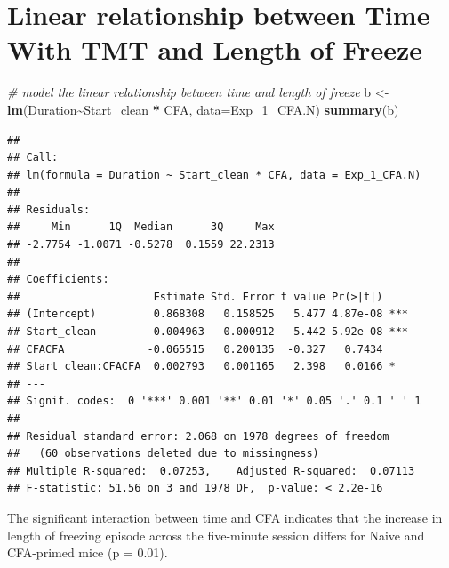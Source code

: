\documentclass[
]{book}
\newenvironment{Shaded}{\begin{snugshade}}{\end{snugshade}}
\newcommand{\AttributeTok}[1]{\textcolor[rgb]{0.13,0.29,0.53}{#1}}
\newcommand{\CommentTok}[1]{\textcolor[rgb]{0.56,0.35,0.01}{\textit{#1}}}
\newcommand{\FunctionTok}[1]{\textcolor[rgb]{0.13,0.29,0.53}{\textbf{#1}}}
\newcommand{\NormalTok}[1]{#1}
\newcommand{\OtherTok}[1]{\textcolor[rgb]{0.56,0.35,0.01}{#1}}
\newcommand{\SpecialCharTok}[1]{\textcolor[rgb]{0.81,0.36,0.00}{\textbf{#1}}}
\newcommand{\StringTok}[1]{\textcolor[rgb]{0.31,0.60,0.02}{#1}}
\begin{document}
\section*{Linear relationship between Time With TMT and Length of Freeze}\label{linear-relationship-between-time-with-tmt-and-length-of-freeze}

\begin{Shaded}
\begin{Highlighting}[]
\CommentTok{\# model the linear relationship between time and length of freeze}
\NormalTok{b }\OtherTok{\textless{}{-}} \FunctionTok{lm}\NormalTok{(Duration}\SpecialCharTok{\textasciitilde{}}\NormalTok{Start\_clean }\SpecialCharTok{*}\NormalTok{ CFA, }\AttributeTok{data=}\NormalTok{Exp\_1\_CFA.N)}
\FunctionTok{summary}\NormalTok{(b)}
\end{Highlighting}
\end{Shaded}

\begin{verbatim}
## 
## Call:
## lm(formula = Duration ~ Start_clean * CFA, data = Exp_1_CFA.N)
## 
## Residuals:
##     Min      1Q  Median      3Q     Max 
## -2.7754 -1.0071 -0.5278  0.1559 22.2313 
## 
## Coefficients:
##                     Estimate Std. Error t value Pr(>|t|)    
## (Intercept)         0.868308   0.158525   5.477 4.87e-08 ***
## Start_clean         0.004963   0.000912   5.442 5.92e-08 ***
## CFACFA             -0.065515   0.200135  -0.327   0.7434    
## Start_clean:CFACFA  0.002793   0.001165   2.398   0.0166 *  
## ---
## Signif. codes:  0 '***' 0.001 '**' 0.01 '*' 0.05 '.' 0.1 ' ' 1
## 
## Residual standard error: 2.068 on 1978 degrees of freedom
##   (60 observations deleted due to missingness)
## Multiple R-squared:  0.07253,    Adjusted R-squared:  0.07113 
## F-statistic: 51.56 on 3 and 1978 DF,  p-value: < 2.2e-16
\end{verbatim}

The significant interaction between time and CFA indicates that the increase in length of freezing episode across the five-minute session differs for Naive and CFA-primed mice (p = 0.01).

\begin{Shaded}
\end{Shaded}
\end{document}
